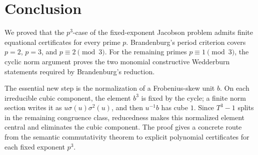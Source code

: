 \section{Conclusion}\label{sec:conclusion}

We proved that the \(p^3\)-case of the fixed-exponent Jacobson problem admits finite equational certificates for every prime \(p\).  Brandenburg's period criterion covers \(p=2\), \(p=3\), and \(p\equiv 2 \pmod 3\).  For the remaining primes \(p\equiv 1 \pmod 3\), the cyclic norm argument proves the two monomial constructive Wedderburn statements required by Brandenburg's reduction.

The essential new step is the normalization of a Frobenius-skew unit \(b\).  On each irreducible cubic component, the element \(b^3\) is fixed by the cycle; a finite norm section writes it as \(u\sigma(u)\sigma^2(u)\), and then \(u^{-1}b\) has cube \(1\).  Since \(T^3-1\) splits in the remaining congruence class, reducedness makes this normalized element central and eliminates the cubic component.  The proof gives a concrete route from the semantic commutativity theorem to explicit polynomial certificates for each fixed exponent \(p^3\).
